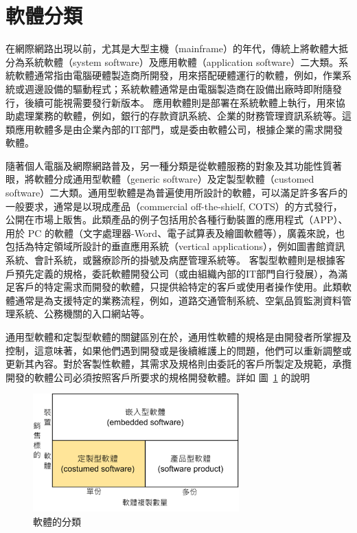 \documentclass[
  letterpaper,
  oneside,
  open=any]{scrbook}
\begin{document}
\section{軟體分類}\label{ux8edfux9ad4ux5206ux985e}

在網際網路出現以前，尤其是大型主機（mainframe）的年代，傳統上將軟體大抵分為系統軟體（system
software）及應用軟體（application
software）二大類。系統軟體通常指由電腦硬體製造商所開發，用來搭配硬體運行的軟體，例如，作業系統或週邊設備的驅動程式；系統軟體通常是由電腦製造商在設備出廠時即附隨發行，後續可能視需要發行新版本。
應用軟體則是部署在系統軟體上執行，用來協助處理業務的軟體，例如，銀行的存款資訊系統、企業的財務管理資訊系統等。這類應用軟體多是由企業內部的IT部門，或是委由軟體公司，根據企業的需求開發軟體。

隨著個人電腦及網際網路普及，另一種分類是從軟體服務的對象及其功能性質著眼，將軟體分成通用型軟體（generic
software）及定製型軟體（customed
software）二大類。通用型軟體是為普遍使用所設計的軟體，可以滿足許多客戶的一般要求，通常是以現成產品（commercial
off-the-shielf,
COTS）的方式發行，公開在市場上販售。此類產品的例子包括用於各種行動裝置的應用程式（APP）、用於
PC
的軟體（文字處理器-Word、電子試算表及繪圖軟體等），廣義來說，也包括為特定領域所設計的垂直應用系統（vertical
applications），例如圖書館資訊系統、會計系統，或醫療診所的掛號及病歷管理系統等。
客製型軟體則是根據客戶預先定義的規格，委託軟體開發公司（或由組織內部的IT部門自行發展），為滿足客戶的特定需求而開發的軟體，只提供給特定的客戶或使用者操作使用。此類軟體通常是為支援特定的業務流程，例如，道路交通管制系統、空氣品質監測資料管理系統、公務機關的入口網站等。

通用型軟體和定製型軟體的關鍵區別在於，通用性軟體的規格是由開發者所掌握及控制，這意味著，如果他們遇到開發或是後續維護上的問題，他們可以重新調整或更新其內容。對於客製性軟體，其需求及規格則由委託的客戶所製定及規範，承攬開發的軟體公司必須按照客戶所要求的規格開發軟體。詳如
圖~\ref{fig-sw-category} 的說明

\begin{figure}

\includegraphics[width=3.125in,height=\textheight,keepaspectratio]{content/../images/sw-category.png}

\caption{\label{fig-sw-category}軟體的分類}

\end{figure}%
\end{document}
